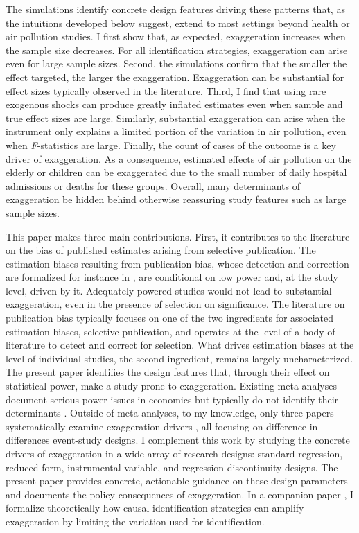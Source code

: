 \documentclass[12pt]{article}
\begin{document}
		The simulations identify concrete design features driving these patterns that, as the intuitions developed below suggest, extend to most settings beyond health or air pollution studies. I first show that, as expected, exaggeration increases when the sample size decreases. For all identification strategies, exaggeration can arise even for large sample sizes. Second, the simulations confirm that the smaller the effect targeted, the larger the exaggeration. Exaggeration can be substantial for effect sizes typically observed in the literature. Third, I find that using rare exogenous shocks can produce greatly inflated estimates even when sample and true effect sizes are large. Similarly, substantial exaggeration can arise when the instrument only explains a limited portion of the variation in air pollution, even when \textit{F}-statistics are large. Finally, the count of cases of the outcome is a key driver of exaggeration. As a consequence, estimated effects of air pollution on the elderly or children can be exaggerated due to the small number of daily hospital admissions or deaths for these groups. Overall, many determinants of exaggeration be hidden behind otherwise reassuring study features such as large sample sizes.
		 
		 This paper makes three main contributions. First, it contributes to the literature on the bias of published estimates arising from selective publication. The estimation biases resulting from publication bias, whose detection and correction are formalized for instance in \cite{andrews_identification_2019}, are conditional on low power and, at the study level, driven by it. Adequately powered studies would not lead to substantial exaggeration, even in the presence of selection on significance. The literature on publication bias typically focuses on one of the two ingredients for associated estimation biases, selective publication, and operates at the level of a body of literature to detect and correct for selection. What drives estimation biases at the level of individual studies, the second ingredient, remains largely uncharacterized. The present paper identifies the design features that, through their effect on statistical power, make a study prone to exaggeration. Existing meta-analyses document serious power issues in economics but typically do not identify their determinants \citep{ioannidis_power_2017, ferraro_feature_2020, young_consistency_2022, arel-bundock_quantitative_2024}. Outside of meta-analyses, to my knowledge, only three papers systematically examine exaggeration drivers \citep{schell_evaluating_2018, griffin_moving_2021, black_simulated_2022}, all focusing on difference-in-differences event-study designs. I complement this work by studying the concrete drivers of exaggeration in a wide array of research designs: standard regression, reduced-form, instrumental variable, and regression discontinuity designs. The present paper provides concrete, actionable guidance on these design parameters and documents the policy consequences of exaggeration. In a companion paper \cite{bagilet_causal_2026}, I formalize theoretically how causal identification strategies can amplify exaggeration by limiting the variation used for identification.
		 
\end{document}
